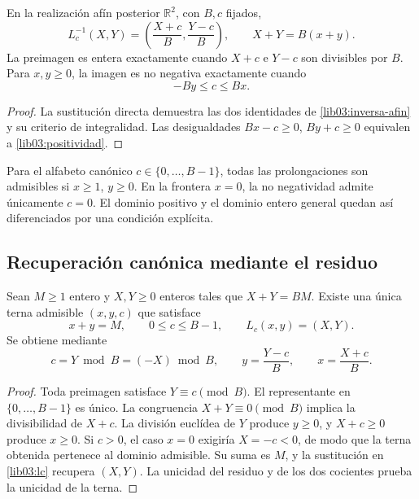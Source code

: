 \begin{proposition}
\label{lib03:prop-inversa}
En la realización afín posterior \(\mathbb R^2\), con \(B,c\) fijados,
\begin{equation}
 L_c^{-1}(X,Y)=\left(\frac{X+c}{B},\frac{Y-c}{B}\right),\qquad
 X+Y=B(x+y).
 \label{lib03:inversa-afin}
\end{equation}
La preimagen es entera exactamente cuando \(X+c\) e \(Y-c\) son
divisibles por \(B\). Para \(x,y\geq0\), la imagen es no negativa
exactamente cuando
\begin{equation}
 -By\leq c\leq Bx.
 \label{lib03:positividad}
\end{equation}
\end{proposition}

\begin{proof}
La sustitución directa demuestra las dos identidades de
\eqref{lib03:inversa-afin} y su criterio de integralidad. Las
desigualdades \(Bx-c\geq0\), \(By+c\geq0\) equivalen a
\eqref{lib03:positividad}.
\end{proof}

Para el alfabeto canónico \(c\in\{0,\ldots,B-1\}\), todas las
prolongaciones son admisibles si \(x\geq1\), \(y\geq0\). En la
frontera \(x=0\), la no negatividad admite únicamente \(c=0\).
El dominio positivo y el dominio entero general quedan así
diferenciados por una condición explícita.

\subsection{Recuperación canónica mediante el residuo}
\label{lib03:residuo}

\begin{theorem}
\label{lib03:teo-residuo}
Sean \(M\geq1\) entero y \(X,Y\geq0\) enteros tales que
\(X+Y=BM\). Existe una única terna admisible \((x,y,c)\) que satisface
\[
 x+y=M,\qquad 0\leq c\leq B-1,\qquad L_c(x,y)=(X,Y).
\]
Se obtiene mediante
\begin{equation}
 c=Y\bmod B=(-X)\bmod B,\qquad
 y=\frac{Y-c}{B},\qquad x=\frac{X+c}{B}.
 \label{lib03:residuo-inversor}
\end{equation}
\end{theorem}

\begin{proof}
Toda preimagen satisface \(Y\equiv c\pmod B\). El representante en
\(\{0,\ldots,B-1\}\) es único. La congruencia \(X+Y\equiv0\pmod B\)
implica la divisibilidad de \(X+c\). La división euclídea de \(Y\)
produce \(y\geq0\), y \(X+c\geq0\) produce \(x\geq0\). Si
\(c>0\), el caso \(x=0\) exigiría \(X=-c<0\), de modo que la
terna obtenida pertenece al dominio admisible. Su suma es \(M\), y
la sustitución en \eqref{lib03:lc} recupera \((X,Y)\). La unicidad
del residuo y de los dos cocientes prueba la unicidad de la terna.
\end{proof}

